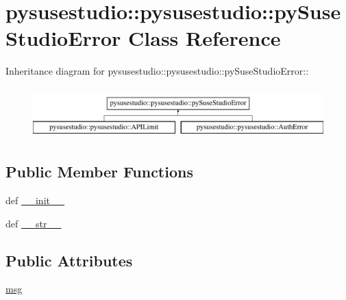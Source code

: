 \hypertarget{classpysusestudio_1_1pysusestudio_1_1py_suse_studio_error}{
\section{pysusestudio::pysusestudio::pySuseStudioError Class Reference}
\label{classpysusestudio_1_1pysusestudio_1_1py_suse_studio_error}
}
Inheritance diagram for pysusestudio::pysusestudio::pySuseStudioError::\begin{figure}[H]
\begin{center}
\leavevmode
\includegraphics[height=1.96491cm]{classpysusestudio_1_1pysusestudio_1_1py_suse_studio_error}
\end{center}
\end{figure}
\subsection*{Public Member Functions}
\begin{DoxyCompactItemize}
\item 
def \hyperlink{classpysusestudio_1_1pysusestudio_1_1py_suse_studio_error_a2c3dab6ab38c0aaf5ab0b652d24644bc}{\_\-\_\-init\_\-\_\-}
\item 
def \hyperlink{classpysusestudio_1_1pysusestudio_1_1py_suse_studio_error_a117b0e3520484fdd941246f2a1bf9345}{\_\-\_\-str\_\-\_\-}
\end{DoxyCompactItemize}
\subsection*{Public Attributes}
\begin{DoxyCompactItemize}
\item 
\hyperlink{classpysusestudio_1_1pysusestudio_1_1py_suse_studio_error_ad793aaac43eed7419fc64adfba1d2b0f}{msg}
\end{DoxyCompactItemize}


